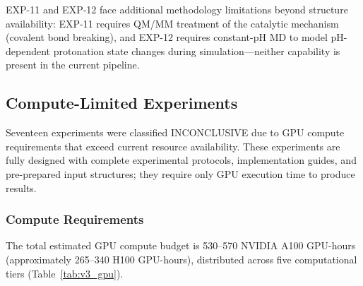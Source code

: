 \documentclass[conference]{IEEEtran}
\begin{document}
EXP-11 and EXP-12 face additional methodology limitations beyond
structure availability: EXP-11 requires QM/MM treatment of the catalytic
mechanism (covalent bond breaking), and EXP-12 requires constant-pH MD
to model pH-dependent protonation state changes during simulation---neither
capability is present in the current pipeline.

\subsection{Compute-Limited Experiments}\label{sec:v3_compute_limited}

Seventeen experiments were classified INCONCLUSIVE due to GPU compute
requirements that exceed current resource availability.  These experiments
are fully designed with complete experimental protocols, implementation
guides, and pre-prepared input structures; they require only GPU execution
time to produce results.

\subsubsection{Compute Requirements}

The total estimated GPU compute budget is 530--570 NVIDIA A100 GPU-hours
(approximately 265--340 H100 GPU-hours), distributed across five
computational tiers (Table~\ref{tab:v3_gpu}).
\end{document}
